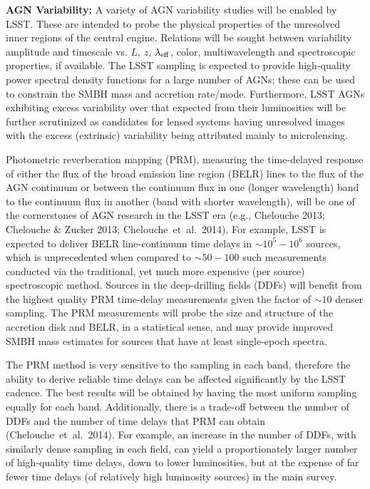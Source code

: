 {\bf AGN Variability:} A variety of AGN variability studies will be enabled by LSST. These are intended to probe the physical properties of the unresolved inner regions of the central engine. Relations will be sought between variability amplitude and timescale vs. $L$, $z$, $\lambda_{\rm eff}$, color, multiwavelength and spectroscopic properties, if available. The LSST sampling is expected to provide high-quality power spectral density functions for a large number of AGNs; these can be used to constrain the SMBH mass and accretion rate/mode. Furthermore, LSST AGNs exhibiting excess variability over that expected from their luminosities will be further scrutinized as candidates for lensed systems having unresolved images with the excess (extrinsic) variability being attributed mainly to microlensing.

Photometric reverberation mapping (PRM), measuring the time-delayed response of either the flux of the broad emission line region (BELR) lines to the flux of the AGN continuum or between the continuum flux in one (longer wavelength) band to the continuum flux in another (band with shorter wavelength), will be one of the cornerstones of AGN research in the LSST era
(e.g., Chelouche 2013; Chelouche \& Zucker 2013; Chelouche~et~al.~2014). For example, LSST is expected to deliver BELR line-continuum time delays in $\sim10^5-10^6$ sources, which is unprecedented when compared to $\sim50-100$ such measurements conducted via the traditional, yet much more expensive (per source) spectroscopic method. Sources in the deep-drilling fields (DDFs) will benefit from the highest quality PRM
time-delay measurements given the factor of $\sim10$ denser sampling. The PRM measurements will probe the size and structure of the accretion disk and BELR, in a statistical sense, and may provide improved SMBH mass estimates for sources that have at least single-epoch spectra.

The PRM method is very sensitive to the sampling in each band, therefore the ability to derive reliable time delays can be affected significantly
by the LSST cadence. The best results will be obtained by having the most uniform sampling equally for each band. Additionally, there is
a trade-off between the number of DDFs and the number of time delays that PRM can obtain (Chelouche~et~al.~2014). For example,
an increase in the number of DDFs, with similarly dense sampling in each field, can yield a proportionately larger number of high-quality time delays,
down to lower luminosities, but at the expense of far fewer time delays (of relatively high luminosity sources) in the main survey.

